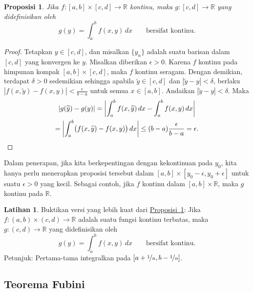 \documentclass[12pt,openany]{book}
\newcommand{\bbabs}[1]{\biggl\lvert {#1} \biggr\rvert}
\newcommand{\abs}[1]{\left\lvert {#1} \right\rvert}
\newcommand{\R}{{\mathbb{R}}}
\theoremstyle{plain}
\newtheorem{prop}[thm]{Proposisi}
\theoremstyle{remark}
\theoremstyle{definition}
\newenvironment{exbox}{%
    \def\FrameCommand{\vrule width 1pt \relax\hspace{10pt}}%
    \MakeFramed{\advance\hsize-\width\FrameRestore}%
}{%
    \endMakeFramed
}
\theoremstyle{exercise}
\newtheorem{exercise}{Latihan}[section]
\theoremstyle{example}
\newcommand{\propref}[1]{\hyperref[#1]{Proposisi~\ref*{#1}}}
\begin{document}
\begin{prop} \label{prop:integralcontcont}
Jika $f \colon [a,b] \times [c,d] \to \R$ kontinu,
maka $g \colon [c,d] \to \R$ yang didefinisikan oleh
\begin{equation*}
g(y) = \int_a^b f(x,y) \,dx  \qquad \text{bersifat kontinu}.
\end{equation*}
\end{prop}

\begin{proof}
Tetapkan $y \in [c,d]$, dan misalkan $\{ y_n \}$ adalah suatu barisan dalam $[c,d]$
yang konvergen ke $y$.
Misalkan diberikan $\epsilon > 0$.
Karena $f$ kontinu pada himpunan kompak $[a,b] \times [c,d]$, maka $f$
kontinu seragam.  
Dengan demikian, terdapat $\delta > 0$ sedemikian sehingga
apabila $\widetilde{y} \in [c,d]$ dan
$\abs{\widetilde{y}-y} < \delta$, berlaku
$\abs{f(x,\widetilde{y})-f(x,y)} < \frac{\epsilon}{b-a}$ untuk semua $x \in [a,b]$.
Andaikan $\abs{\widetilde{y}-y} < \delta$.  Maka
\begin{multline*}
\abs{
g(\widetilde{y})-
g(y)
}
=
\bbabs{
\int_a^b 
f(x,\widetilde{y}) \,dx 
-
\int_a^b 
f(x,y) \,dx 
}
\\
=
\bbabs{
\int_a^b 
\bigl(
f(x,\widetilde{y}) - f(x,y)
\bigr)
\,dx 
}
\leq
(b-a)
\frac{\epsilon}{b-a}
= \epsilon . \qedhere
\end{multline*}
\end{proof}

Dalam penerapan, jika kita berkepentingan dengan kekontinuan pada $y_0$, kita hanya
perlu menerapkan proposisi tersebut dalam $[a,b] \times [y_0-\epsilon,y_0+\epsilon]$
untuk suatu $\epsilon > 0$ yang kecil.  Sebagai contoh, jika $f$ kontinu dalam
$[a,b] \times \R$, maka $g$ kontinu pada $\R$.

\begin{exbox}
\begin{exercise} \label{exercise:integralcontcontextra}
Buktikan versi yang lebih kuat dari \propref{prop:integralcontcont}:
Jika $f \colon (a,b) \times (c,d) \to \R$ adalah suatu fungsi kontinu terbatas,
maka $g \colon (c,d) \to \R$ yang didefinisikan oleh
\begin{equation*}
g(y) = \int_a^b f(x,y) \,dx  \qquad \text{bersifat kontinu}.
\end{equation*}
Petunjuk: Pertama-tama integralkan pada $[a+\nicefrac{1}{n},b-\nicefrac{1}{n}]$.
\end{exercise}
\end{exbox}

\subsection{Teorema Fubini}
\end{document}

